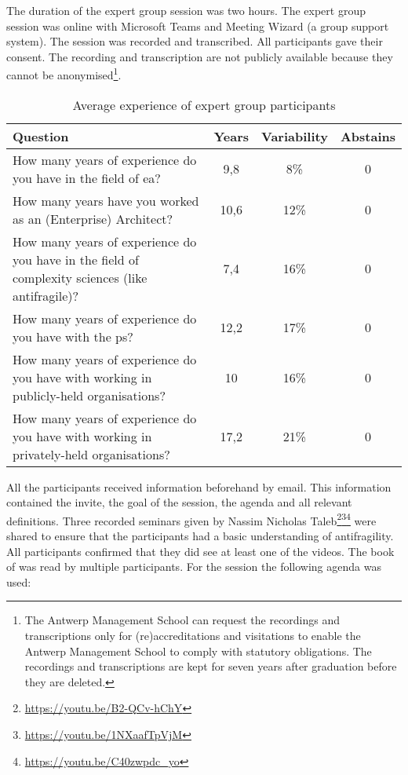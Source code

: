 The duration of the expert group session was two hours. The expert group session was online with Microsoft Teams and Meeting Wizard (a group support system). The session was recorded and transcribed. All participants gave their consent. The recording and transcription are not publicly available because they cannot be anonymised\footnote{The Antwerp Management School can request the recordings and transcriptions only for (re)accreditations and visitations to enable the Antwerp Management School to comply with statutory obligations. The recordings and transcriptions are kept for seven years after graduation before they are deleted.}.
\begin{longtable}{@{}p{}ccc@{}}
	\toprule%
	\textbf{Question} & \textbf{Years} & \textbf{Variability} & \textbf{Abstains} \\
	\midrule%
	\endhead%
	\hline
	\endfoot%
	\caption[Average experience of expert group participants]{Average experience of expert group participants}
	\label{tab:experiencevalidationgroup}%
	\endlastfoot%
	How many years of experience do you have in the field of \acrlong{ea}? & 9,8 & 8\% & 0 \\%
	How many years have you worked as an (Enterprise) Architect? & 10,6 & 12\% & 0 \\%
	How many years of experience do you have in the field of complexity sciences (like \gls{antifragile})? & 7,4 & 16\% & 0 \\%
	How many years of experience do you have with the \gls{ps}? & 12,2 & 17\% & 0 \\%
	How many years of experience do you have with working in publicly-held organisations? & 10 & 16\% & 0 \\%
	How many years of experience do you have with working in privately-held organisations? & 17,2 & 21\% & 0 \\%
	\bottomrule%
\end{longtable}
All the participants received information beforehand by email. This information contained the invite, the goal of the session, the agenda and all relevant definitions. Three recorded seminars given by Nassim Nicholas Taleb\footnote{\url{https://youtu.be/B2-QCv-hChY}}\footnote{\url{https://youtu.be/1NXaafTpVjM}}\footnote{\url{https://youtu.be/C40zwpdc_yo}} were shared to ensure that the participants had a basic understanding of \gls{antifragility}. All participants confirmed that they did see at least one of the videos. The book of \textcite{Taleb2012} was read by multiple participants. For the session the following agenda was used:
